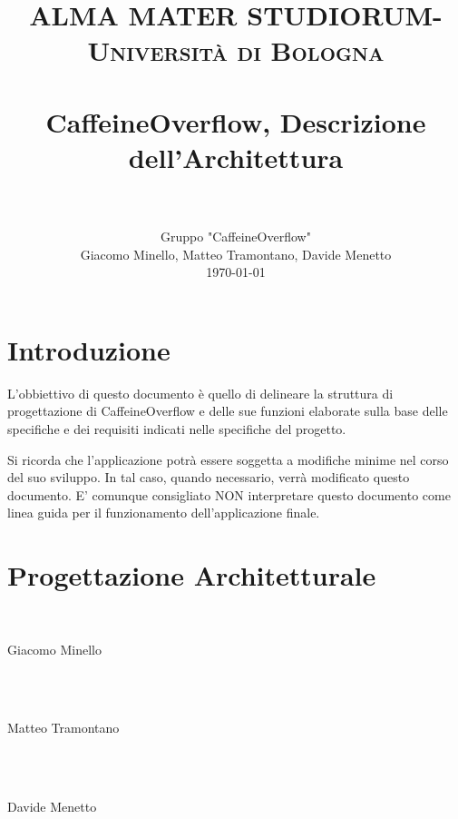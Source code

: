 \documentclass[paper=a4, fontsize=11pt]{scrartcl}
\title{
		\usefont{OT1}{bch}{b}{n}
		\normalfont \normalsize \textsc{ALMA MATER STUDIORUM- Università di Bologna} \\ [25pt]
		\horrule{0.5pt} \\[0.4cm]
		\huge CaffeineOverflow, Descrizione dell'Architettura \\
		\horrule{2pt} \\[0.5cm]
}
\author{ Gruppo "CaffeineOverflow"\\
		\normalfont 								\normalsize
        Giacomo Minello, Matteo Tramontano, Davide Menetto\\[-3pt]		\normalsize
        \today
}
\date{}
\numberwithin{equation}{section}		%
\numberwithin{figure}{section}			%
\numberwithin{table}{section}				%
\begin{document}
\maketitle
\section{Introduzione}
L'obbiettivo di questo documento è quello di delineare la struttura di progettazione di CaffeineOverflow e delle sue funzioni elaborate sulla base delle specifiche e dei requisiti indicati nelle specifiche del progetto.


Si ricorda che l'applicazione potrà essere soggetta a modifiche minime nel corso del suo sviluppo. In tal caso, quando necessario, verrà modificato questo documento. E' comunque consigliato NON interpretare questo documento come linea guida per il funzionamento dell'applicazione finale.
\section{Progettazione Architetturale}

\\
\begin{flushright}
Giacomo Minello
\end{flushright}
\\~\\
\begin{flushright}
Matteo Tramontano
\end{flushright}
\\~\\
\begin{flushright}
Davide Menetto
\end{flushright}
\end{document}
